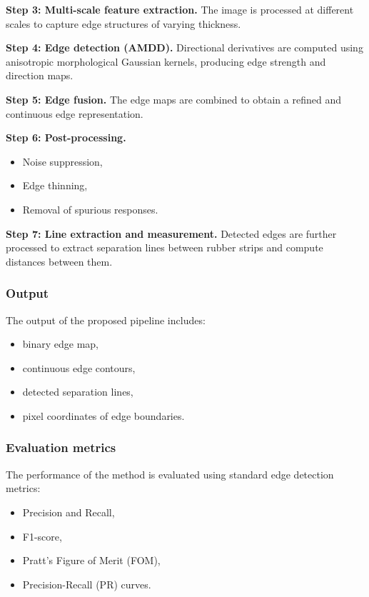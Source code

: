 \documentclass[11pt]{article}
\begin{document}
\textbf{Step 3: Multi-scale feature extraction.} The image is processed at different scales to capture edge structures of varying thickness.

\textbf{Step 4: Edge detection (AMDD).} Directional derivatives are computed using anisotropic morphological Gaussian kernels, producing edge strength and direction maps.

\textbf{Step 5: Edge fusion.} The edge maps are combined to obtain a refined and continuous edge representation.

\textbf{Step 6: Post-processing.}
\begin{itemize}
    \item Noise suppression,
    \item Edge thinning,
    \item Removal of spurious responses.
\end{itemize}

\textbf{Step 7: Line extraction and measurement.} Detected edges are further processed to extract separation lines between rubber strips and compute distances between them.

\subsubsection{Output}

The output of the proposed pipeline includes:
\begin{itemize}
    \item binary edge map,
    \item continuous edge contours,
    \item detected separation lines,
    \item pixel coordinates of edge boundaries.
\end{itemize}

\subsubsection{Evaluation metrics}

The performance of the method is evaluated using standard edge detection metrics:
\begin{itemize}
    \item Precision and Recall,
    \item F1-score,
    \item Pratt’s Figure of Merit (FOM),
    \item Precision-Recall (PR) curves.
\end{itemize}
\end{document}
